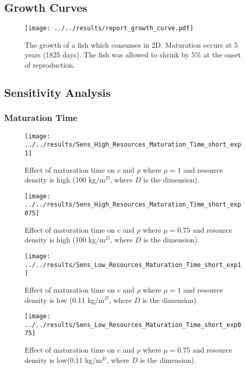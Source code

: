 \begin{refsection}
\subsection{Growth Curves}
\begin{figure}[h]
	\centering
	\texttt{[image: ../../results/report\_growth\_curve.pdf]}
	\caption{The growth of a fish which consumes in 2D.  Maturation occurs at 5 years (1825 days).  The fish was allowed to shrink by 5\% at the onset of reproduction.}
	\label{growth_curve}
\end{figure}

\clearpage
\subsection{Sensitivity Analysis}
\subsubsection{Maturation Time}
\begin{figure}[H]
	\centering
	\texttt{[image: ../../results/Sens\_High\_Resources\_Maturation\_Time\_short\_exp1]}
	\caption{Effect of maturation time on $c$ and $\rho$ where $\mu = 1$ and resource density is high (100 kg/m$^D$, where $D$ is the dimension).}
	\label{fig:senshighresourcesmaturationtimeshortexp1}
\end{figure}
\begin{figure}[h]
	\centering
	\texttt{[image: ../../results/Sens\_High\_Resources\_Maturation\_Time\_short\_exp075]}
	\caption{Effect of maturation time on $c$ and $\rho$ where $\mu = 0.75$ and resource density is high (100 kg/m$^D$, where $D$ is the dimension).}
	\label{fig:sensmaturationtimeshortexp075}
\end{figure}
\begin{figure}[h]
	\centering
	\texttt{[image: ../../results/Sens\_Low\_Resources\_Maturation\_Time\_short\_exp1]}
	\caption{Effect of maturation time on $c$ and $\rho$ where $\mu = 1$ and resource density is low (0.11 kg/m$^D$, where $D$ is the dimension).}
	\label{fig:senslowresourcesmaturationtimeshortexp1}
\end{figure}
\begin{figure}[h]
	\centering
	\texttt{[image: ../../results/Sens\_Low\_Resources\_Maturation\_Time\_short\_exp075]}
	\caption{Effect of maturation time on $c$ and $\rho$ where $\mu = 0.75$ and resource density is low(0.11 kg/m$^D$, where $D$ is the dimension).}
	\label{fig:senslowresourcesmaturationtimeshortexp075}

\end{figure}
\end{refsection}
